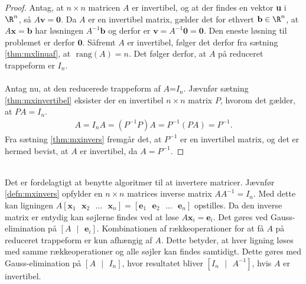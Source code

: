 \begin{proof}
Antag, at $n\times n$ matricen $A$ er invertibel, og at der findes en vektor \textbf{u} i $\R^n$, så $A\textbf{v}=\textbf{0}$. 
Da $A$ er en invertibel matrix, gælder det for ethvert $\mathbf{b} \in \R^n$, at $A\textbf{x}=\mathbf{b}$ har løsningen $A^{-1}\mathbf{b}$ og derfor er $\textbf{v}=A^{-1}\textbf{0}=\textbf{0}$. 
Den eneste løsning til problemet er derfor $\textbf{0}$. 
Såfremt $A$ er invertibel, følger det derfor fra sætning \ref{thm:mxlinuaf}, at $\text{ rang}(A)=n$.
Det følger derfor, at $A$ på reduceret trappeform er $I_n$.
\\\\
Antag nu, at den reducerede trappeform af $A$=$I_n$. 
Jævnfør sætning \ref{thm:mxinvertibel} eksister der en invertibel $n \times n$ matrix $P$, hvorom det gælder, at $PA=I_n$. 
%
\begin{align*}
A=I_nA=(P^{-1}P)A=P^{-1}(PA)=P^{-1}.
\end{align*}
%
Fra sætning \ref{thm:mxinvers} fremgår det, at $P^{-1}$ er en invertibel matrix, og det er hermed bevist, at $A$ er invertibel, da $A=P^{-1}$.
\end{proof}
\\
Det er fordelagtigt at benytte algoritmer til at invertere matricer.
Jævnfør \ref{defn:mxinvers} opfylder en $n \times n$ matrices inverse matrix $AA^{-1}=I_n$.
Med dette kan ligningen $A[\textbf{x}_1\text{  }\textbf{x}_2\text{  }\ldots\text{  }\textbf{x}_n ] = [\textbf{e}_1\text{  }\textbf{e}_2\text{  }\ldots\text{  }\textbf{e}_n ]$ opstilles.
Da den inverse matrix er entydig kan søjlerne findes ved at løse $A\textbf{x}_i = \textbf{e}_i$.
Det gøres ved Gauss-elimination på $[A\textbf{ }|\textbf{ }\textbf{e}_i]$.
Kombinationen af rækkeoperationer for at få $A$ på reduceret trappeform er kun afhængig af $A$.
Dette betyder, at hver ligning løses med samme rækkeoperationer og alle søjler kan findes samtidigt.
Dette gøres med Gauss-elimination på $[A\textbf{ }|\textbf{ }I_n]$, hvor resultatet bliver $[I_n\textbf{ }|\textbf{ }A^{-1}]$, hvis $A$ er invertibel.\\
%
%
